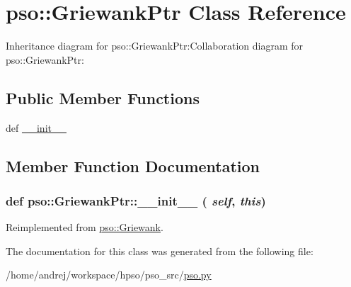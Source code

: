 \hypertarget{classpso_1_1GriewankPtr}{
\section{pso::GriewankPtr Class Reference}
\label{classpso_1_1GriewankPtr}
}
Inheritance diagram for pso::GriewankPtr:Collaboration diagram for pso::GriewankPtr:\subsection*{Public Member Functions}
\begin{CompactItemize}
\item 
def \hyperlink{classpso_1_1GriewankPtr_0814eb7cbb6badaa00a5eeb06077b7db}{\_\-\_\-init\_\-\_\-}
\end{CompactItemize}


\subsection{Member Function Documentation}
\hypertarget{classpso_1_1GriewankPtr_0814eb7cbb6badaa00a5eeb06077b7db}{
\subsubsection{\setlength{\rightskip}{0pt plus 5cm}def pso::GriewankPtr::\_\-\_\-init\_\-\_\- ( {\em self}, \/   {\em this})}}
\label{classpso_1_1GriewankPtr_0814eb7cbb6badaa00a5eeb06077b7db}




Reimplemented from \hyperlink{classpso_1_1Griewank_c84ac13db6c58cd5ca948ba0340ab4f8}{pso::Griewank}.

The documentation for this class was generated from the following file:\begin{CompactItemize}
\item 
/home/andrej/workspace/hpso/pso\_\-src/\hyperlink{pso_8py}{pso.py}\end{CompactItemize}
